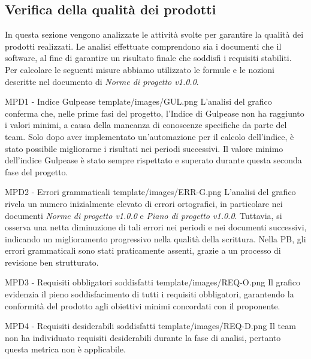 \subsection{Verifica della qualità dei prodotti}
In questa sezione vengono analizzate le attività svolte per garantire la qualità dei prodotti realizzati.
Le analisi effettuate comprendono sia i documenti che il software, al fine di garantire un risultato finale che soddisfi i requisiti stabiliti.\\
Per calcolare le seguenti misure abbiamo utilizzato le formule e le nozioni descritte nel documento di \textit{Norme di progetto v1.0.0}.

\Met
{ %
    MPD1 - Indice Gulpease
}
{ %
    template/images/GUL.png
}
{ %
    L'analisi del grafico conferma che, nelle prime fasi del progetto, l'Indice di Gulpease non ha raggiunto i 
    valori minimi, a causa della mancanza di conoscenze specifiche da parte del team.
    Solo dopo aver implementato un'automazione per il calcolo dell'indice, è stato possibile 
    migliorarne i risultati nei periodi successivi.
}
{ %
    Il valore minimo dell'indice Gulpease è stato sempre rispettato e superato durante questa seconda fase del progetto.
}

\Met
{ %
    MPD2 - Errori grammaticali
}
{ %
    template/images/ERR-G.png
}
{ %
    L'analisi del grafico rivela un numero inizialmente elevato di errori ortografici, 
    in particolare nei documenti \textit{Norme di progetto v1.0.0} e \textit{Piano di progetto v1.0.0}.
    Tuttavia, si osserva una netta diminuzione di tali errori nei periodi e nei 
    documenti successivi, indicando un miglioramento progressivo nella qualità della scrittura.
}
{ %
    Nella PB, gli errori grammaticali sono stati praticamente assenti, grazie a un processo di revisione ben strutturato.
}

\MetNoPB
{ %
    MPD3 - Requisiti obbligatori soddisfatti     
}
{ %
    template/images/REQ-O.png
}
{   %
    Il grafico evidenzia il pieno soddisfacimento di tutti i requisiti obbligatori, garantendo la conformità del prodotto agli obiettivi minimi concordati con il proponente.
}

\MetNoPB
{ %
    MPD4 - Requisiti desiderabili soddisfatti    
}
{ %
    template/images/REQ-D.png
}
{   %
    Il team non ha individuato requisiti desiderabili durante la fase di analisi, pertanto questa metrica non è applicabile.
}


